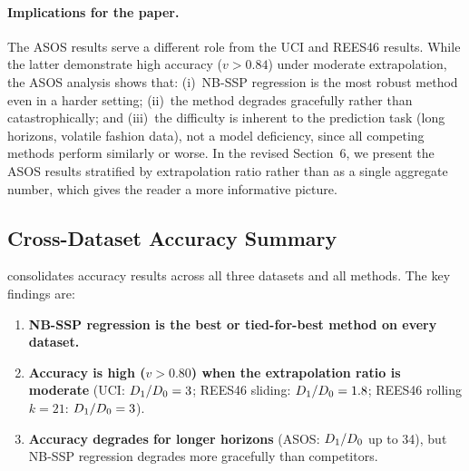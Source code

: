\paragraph{Implications for the paper.}
The ASOS results serve a different role from the UCI and REES46
results.
While the latter demonstrate high accuracy ($v > 0.84$) under
moderate extrapolation, the ASOS analysis shows that:
(i)~NB-SSP regression is the most robust method even in a
harder setting;
(ii)~the method degrades gracefully rather than catastrophically;
and (iii)~the difficulty is inherent to the prediction task
(long horizons, volatile fashion data), not a model deficiency,
since all competing methods perform similarly or worse.
In the revised Section~6, we present the ASOS results stratified
by extrapolation ratio rather than as a single aggregate number,
which gives the reader a more informative picture.

\subsection{Cross-Dataset Accuracy Summary}
\label{subsec:cross_dataset}

 consolidates accuracy results across
all three datasets and all methods.
The key findings are:
\begin{enumerate}[leftmargin=*]
  \item \textbf{NB-SSP regression is the best or tied-for-best
        method on every dataset.}
  \item \textbf{Accuracy is high ($v > 0.80$) when the
        extrapolation ratio is moderate}
        (UCI: $D_1/D_0 = 3$;
        REES46 sliding: $D_1/D_0 = 1.8$;
        REES46 rolling $k{=}21$: $D_1/D_0 = 3$).
  \item \textbf{Accuracy degrades for longer horizons}
        (ASOS: $D_1/D_0$ up to 34),
        but NB-SSP regression degrades more gracefully than
        competitors.
\end{enumerate}

